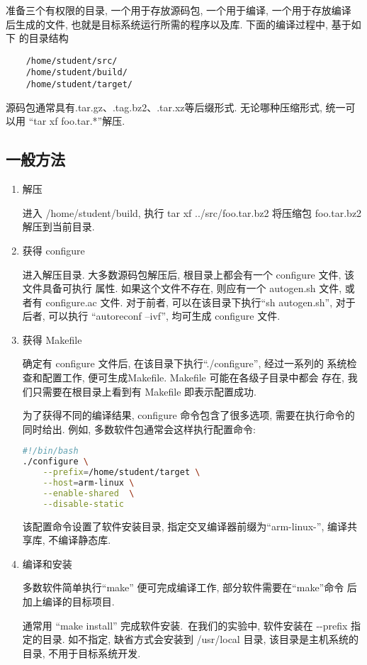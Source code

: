     准备三个有权限的目录, 一个用于存放源码包, 一个用于编译, 一个用于存放编译
后生成的文件, 也就是目标系统运行所需的程序以及库. 下面的编译过程中, 基于如下
的目录结构

\begin{verbatim}
    /home/student/src/
    /home/student/build/
    /home/student/target/
\end{verbatim}

    源码包通常具有.tar.gz、.tag.bz2、.tar.xz等后缀形式. 无论哪种压缩形式,
统一可以用 ``tar xf foo.tar.*''解压.

\subsection{一般方法}
\begin{enumerate}
  \item 解压

      进入 /home/student/build, 执行 tar xf ../src/foo.tar.bz2 将压缩包
      foo.tar.bz2 解压到当前目录.
  \item 获得 configure

      进入解压目录.
      大多数源码包解压后, 根目录上都会有一个 configure 文件, 该文件具备可执行
      属性. 如果这个文件不存在, 则应有一个 autogen.sh 文件, 或者有
      configure.ac 文件. 对于前者, 可以在该目录下执行``sh autogen.sh'',
      对于后者, 可以执行 ``autoreconf --ivf'', 均可生成 configure 文件.
  \item 获得 Makefile

      确定有 configure 文件后, 在该目录下执行``./configure'', 经过一系列的
      系统检查和配置工作, 便可生成Makefile. Makefile 可能在各级子目录中都会
      存在, 我们只需要在根目录上看到有 Makefile 即表示配置成功.

      为了获得不同的编译结果, configure 命令包含了很多选项, 需要在执行命令的
      同时给出. 例如, 多数软件包通常会这样执行配置命令:

\lstset{numbers=none,columns=flexible} 
\lstset{frameround=fttt,frame=trBL}
\begin{lstlisting}[language=bash,firstline=2,deletekeywords=enable]
#!/bin/bash
./configure \
    --prefix=/home/student/target \
    --host=arm-linux \
    --enable-shared  \
    --disable-static
\end{lstlisting}

该配置命令设置了软件安装目录, 指定交叉编译器前缀为``arm-linux-'',
编译共享库, 不编译静态库.

  \item 编译和安装

      多数软件简单执行``make'' 便可完成编译工作, 部分软件需要在``make''命令
      后加上编译的目标项目.

      通常用 ``make install'' 完成软件安装.~在我们的实验中, 软件安装在
      -{}-prefix 指定的目录. 如不指定, 缺省方式会安装到 /usr/local 目录, 
      该目录是主机系统的目录, 不用于目标系统开发.

\end{enumerate}

